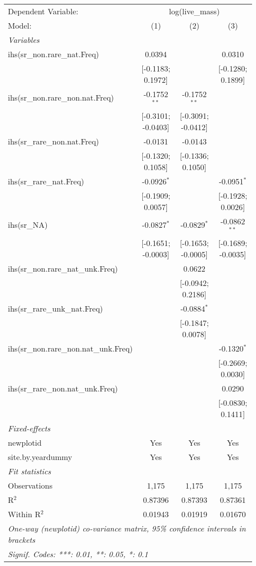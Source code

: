 \begin{tabular}{lccc}
\tabularnewline\midrule\midrule
Dependent Variable:&\multicolumn{3}{c}{log(live\_mass)}\\
Model:&(1) & (2) & (3)\\
\midrule \emph{Variables}&   &   &  \\
ihs(sr\_non.rare\_nat.Freq)&0.0394 &    & 0.0310\\
  &[-0.1183; 0.1972] &    & [-0.1280; 0.1899]\\
ihs(sr\_non.rare\_non.nat.Freq)&-0.1752$^{**}$ & -0.1752$^{**}$ &   \\
  &[-0.3101; -0.0403] & [-0.3091; -0.0412] &   \\
ihs(sr\_rare\_non.nat.Freq)&-0.0131 & -0.0143 &   \\
  &[-0.1320; 0.1058] & [-0.1336; 0.1050] &   \\
ihs(sr\_rare\_nat.Freq)&-0.0926$^{*}$ &    & -0.0951$^{*}$\\
  &[-0.1909; 0.0057] &    & [-0.1928; 0.0026]\\
ihs(sr\_NA)&-0.0827$^{*}$ & -0.0829$^{*}$ & -0.0862$^{**}$\\
  &[-0.1651; -0.0003] & [-0.1653; -0.0005] & [-0.1689; -0.0035]\\
ihs(sr\_non.rare\_nat\_unk.Freq)&   & 0.0622 &   \\
  &   & [-0.0942; 0.2186] &   \\
ihs(sr\_rare\_unk\_nat.Freq)&   & -0.0884$^{*}$ &   \\
  &   & [-0.1847; 0.0078] &   \\
ihs(sr\_non.rare\_non.nat\_unk.Freq)&   &    & -0.1320$^{*}$\\
  &   &    & [-0.2669; 0.0030]\\
ihs(sr\_rare\_non.nat\_unk.Freq)&   &    & 0.0290\\
  &   &    & [-0.0830; 0.1411]\\
\midrule \emph{Fixed-effects}&   &   &  \\
newplotid & Yes & Yes & Yes\\
site.by.yeardummy & Yes & Yes & Yes\\
\midrule \emph{Fit statistics}&  & & \\
Observations & 1,175&1,175&1,175\\
R$^2$ & 0.87396&0.87393&0.87361\\
Within R$^2$ & 0.01943&0.01919&0.01670\\
\midrule\midrule\multicolumn{4}{l}{\emph{One-way (newplotid) co-variance matrix, 95\% confidence intervals in brackets}}\\
\multicolumn{4}{l}{\emph{Signif. Codes: ***: 0.01, **: 0.05, *: 0.1}}\\
\end{tabular}


